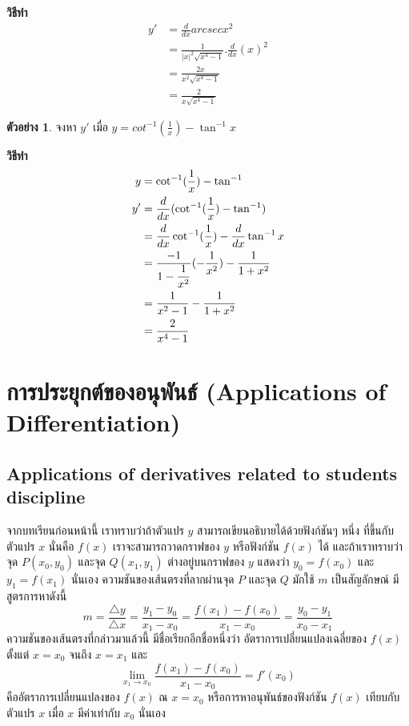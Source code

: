 \documentclass[
]{book}
\theoremstyle{definition}
\theoremstyle{definition}
\newtheorem{example}{ตัวอย่าง}[chapter]
\theoremstyle{definition}
\theoremstyle{definition}
\theoremstyle{remark}
\begin{document}
\textbf{วิธีทำ} \begin{equation}   \begin{aligned}
 \displaystyle y'&=\frac{d}{dx}arcsec
x^{2}\\
&=\displaystyle \frac{1}{|x|^{2}\sqrt{x^{4}-1}}.\frac{d}{dx}(x)^{2}\\
&=\displaystyle \frac{2x}{x^{2}\sqrt{x^{4}-1}}\\
&=\displaystyle \frac{2}{x\sqrt{x^{4}-1}}
  \end{aligned} \end{equation}

\begin{example}
จงหา \(y'\) เมื่อ \(y=cot^{-1}\displaystyle(\frac{1}{x})-\tan^{-1}x\)
\end{example}

\textbf{วิธีทำ} \begin{equation}   \begin{aligned}
\displaystyle y&=\cot^{-1}(\frac{1}{x})-\tan^{-1}\\
\displaystyle y'&=\frac{d}{dx}(\cot^{-1}(\frac{1}{x})-\tan^{-1})\\
\displaystyle &=\frac{d}{dx}\cot^{-1}(\displaystyle
\frac{1}{x})-\frac{d}{dx}\tan^{-1}x\\
\displaystyle &=\frac{-1}{1-\displaystyle
\frac{1}{x^{2}}}(-\frac{1}{x^{2}})-\frac{1}{1+x^{2}}\\
\displaystyle &=\frac{1}{x^{2}-1}-\frac{1}{1+x^{2}}\\
\displaystyle &=\frac{2}{x^{4}-1}
  \end{aligned} \end{equation}

\chapter{การประยุกต์ของอนุพันธ์ (Applications of Differentiation)}\label{uxe01uxe32uxe23uxe1buxe23uxe30uxe22uxe01uxe15uxe02uxe2duxe07uxe2duxe19uxe1euxe19uxe18-applications-of-differentiation}

\section{Applications of derivatives related to students discipline}\label{applications-of-derivatives-related-to-students-discipline}

จากบทเรียนก่อนหน้านี้ เราทราบว่าถ้าตัวแปร \(y\) สามารถเขียนอธิบายได้ด้วยฟังก์ชันๆ หนึ่ง
ที่ขึ้นกับตัวแปร \(x\) นั่นคือ \(f(x)\) เราจะสามารถวาดกราฟของ \(y\) หรือฟังก์ชัน \(f(x)\) ได้
และถ้าเราทราบว่า จุด \(P(x_0,y_0)\) และจุด \(Q(x_1,y_1)\) ต่างอยู่บนกราฟของ \(y\)
แสดงว่า \(y_0=f(x_0)\) และ \(y_1=f(x_1)\) นั่นเอง ความชันของเส้นตรงที่ลากผ่านจุด \(P\)
และจุด \(Q\) มักใช้ \(m\) เป็นสัญลักษณ์ มีสูตรการหาดังนี้
\[m=\frac{\triangle y}{\triangle x}=\frac{y_1-y_0}{ x_1-x_0}=\frac{f(x_1)-f(x_0)}{ x_1-x_0}=\frac{y_0-y_1}{ x_0-x_1}\]
ความชันของเส้นตรงที่กล่าวมาแล้วนี้ มีชื่อเรียกอีกชื่อหนึ่งว่า อัตราการเปลี่ยนแปลงเฉลี่ยของ
\(f(x)\) ตั้งแต่ \(x=x_0\) จนถึง \(x=x_1\) และ
\[\lim_{x_1 \rightarrow x_0} \frac{f(x_1)-f(x_0)}{ x_1-x_0} =f'(x_0)\]
คืออัตราการเปลี่ยนแปลงของ \(f(x)\) ณ \(x=x_0\) หรือการหาอนุพันธ์ของฟังก์ชัน \(f(x)\)
เทียบกับตัวแปร \(x\) เมื่อ \(x\) มีค่าเท่ากับ \(x_0\) นั่นเอง
\end{document}
